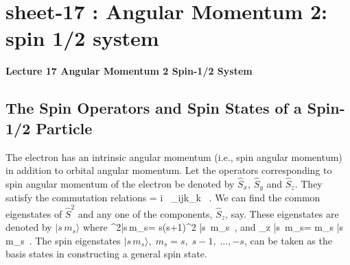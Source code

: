 
\chapter{sheet-17 : Angular Momentum 2: spin 1/2 system}


\ifpdf
\graphicspath{{Chapter17/figs/}}
\else
\graphicspath{{Chapter17/figs/}}
\fi


\setcounter{chapter}{17}
\noindent
\begin{Large}
	{\bf Lecture 17 \newline
		Angular Momentum 2 \newline
		Spin-1/2 System
	}
\end{Large}


\vspace{5 mm}

\section{The Spin Operators and Spin States of a Spin-1/2 Particle}
The electron has an intrinsic angular momentum (i.e., spin angular momentum) in addition to orbital angular momentum. Let the operators corresponding to spin angular momentum of the electron be denoted by
$\hat{S}_x$, $\hat{S}_y$ and $\hat{S}_z$. They satisfy the commutation relations
 = i \hbar\, \epsilon_{ijk}_k \, .
\label{eq:commutation} 
\ee
We can find the common eigenstates of $\hat{S}^2$ and any one of the components, $\hat{S}_z$, say. These eigenstates are denoted by $|s\, m_s\rangle$ where
\be
{}^2|s\,m_s\rangle = s(s+1)\hbar^2 |s\, m_s\rangle\, ,
\ee
and
\be
{}_z |s\, m_s\rangle = m_s \hbar |s\, m_s\rangle\, . 
\ee
The spin eigenstates $|s\, m_s\rangle,\; m_s = s,\; s-1,\; \dots ,-s$, can be taken as the basis states in constructing a general spin state.

